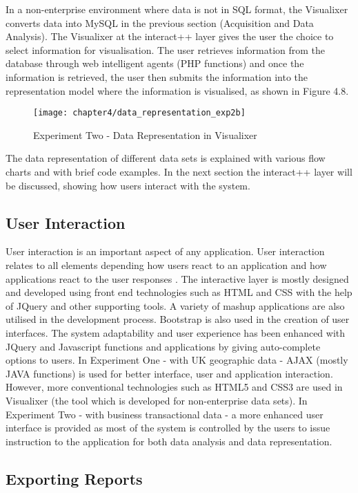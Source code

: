 In a non-enterprise environment where data is not in SQL format, the Visualixer converts data into MySQL in the previous section (Acquisition and Data Analysis). The Visualixer at the interact++ layer gives the user the choice to select information for visualisation. The user retrieves information from the database through web intelligent agents (PHP functions) and once the information is retrieved, the user then submits the information into the representation model where the information is visualised, as shown in Figure 4.8.

\begin{figure}[H]
\centering
\texttt{[image: chapter4/data\_representation\_exp2b]}
\caption{Experiment Two - Data Representation in Visualixer}
\end{figure}

The data representation of different data sets is explained with various flow charts and with brief code examples. In the next section the interact++ layer will be discussed, showing how users interact with the system. 

\subsection{User Interaction}

User interaction is an important aspect of any application. User interaction relates to all elements depending how users react to an application and how applications react to the user responses \cite{hix1993developing}. The interactive layer is mostly designed and developed using front end technologies such as HTML and CSS with the help of JQuery and other supporting tools. A variety of mashup applications are also utilised in the development process. Bootstrap is also used in the creation of user interfaces. The system adaptability and user experience has been enhanced with JQuery and Javascript functions and applications by giving auto-complete options to users. In Experiment One - with UK geographic data - AJAX (mostly JAVA functions) is used for better interface, user and application interaction. However, more conventional technologies such as HTML5 and CSS3 are used in Visualixer (the tool which is developed for non-enterprise data sets). In Experiment Two - with business transactional data - a more enhanced user interface is provided as most of the system is controlled by the users to issue instruction to the application for both data analysis and data representation. 

\subsection{Exporting Reports}

